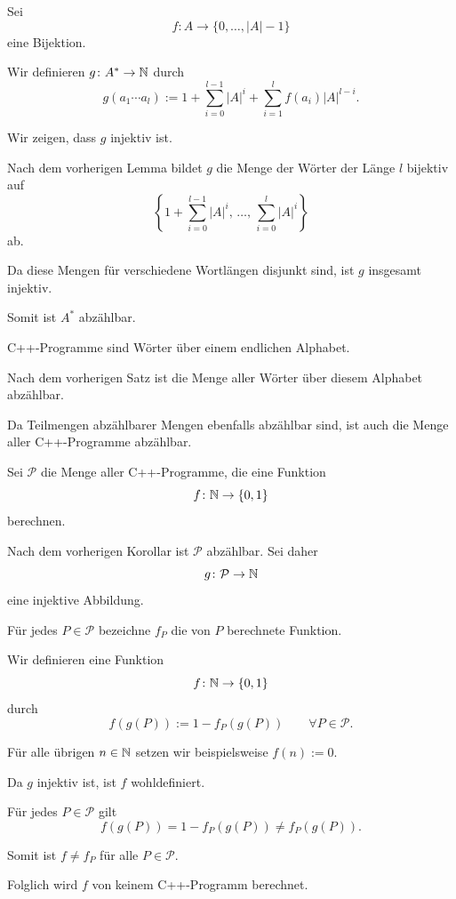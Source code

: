 
\begin{myproof}
  Sei
  \[
    f\colon A\to\{0,\dots,|A|-1\}
  \]
  eine Bijektion.

  Wir definieren $g\colon A^*\to\mathbb{N}$ durch
  \[
    g(a_1\cdots a_l)
    :=1+\sum_{i=0}^{l-1}|A|^i
    +\sum_{i=1}^l f(a_i)|A|^{l-i}.
  \]

  Wir zeigen, dass $g$ injektiv ist.

  Nach dem vorherigen Lemma bildet $g$ die Menge
  der Wörter der Länge $l$ bijektiv auf
  \[
    \left\{
      1+\sum_{i=0}^{l-1}|A|^i,\,
      \dots,\,
      \sum_{i=0}^l|A|^i
    \right\}
  \]
  ab.

  Da diese Mengen für verschiedene Wortlängen
  disjunkt sind, ist $g$ insgesamt injektiv.

  Somit ist $A^*$ abzählbar.
\end{myproof}



\begin{myproof}
  C++-Programme sind Wörter über einem endlichen Alphabet.

  Nach dem vorherigen Satz ist die Menge aller
  Wörter über diesem Alphabet abzählbar.

  Da Teilmengen abzählbarer Mengen ebenfalls
  abzählbar sind, ist auch die Menge aller
  C++-Programme abzählbar.
\end{myproof}



\begin{myproof}
  Sei $\mathcal P$ die Menge aller C++-Programme,
  die eine Funktion
  \[
    f\colon\mathbb{N}\to\{0,1\}
  \]
  berechnen.

  Nach dem vorherigen Korollar ist $\mathcal P$
  abzählbar. Sei daher
  \[
    g\colon\mathcal P\to\mathbb{N}
  \]
  eine injektive Abbildung.

  Für jedes $P\in\mathcal P$ bezeichne $f_P$
  die von $P$ berechnete Funktion.

  Wir definieren eine Funktion
  \[
    f\colon\mathbb{N}\to\{0,1\}
  \]
  durch
  \[
    f(g(P)):=1-f_P(g(P))
    \qquad\forall P\in\mathcal P.
  \]

  Für alle übrigen $n\in\mathbb{N}$ setzen wir
  beispielsweise $f(n):=0$.

  Da $g$ injektiv ist, ist $f$ wohldefiniert.

  Für jedes $P\in\mathcal P$ gilt
  \[
    f(g(P))=1-f_P(g(P))\ne f_P(g(P)).
  \]

  Somit ist $f\ne f_P$ für alle $P\in\mathcal P$.

  Folglich wird $f$ von keinem C++-Programm berechnet.
\end{myproof}

